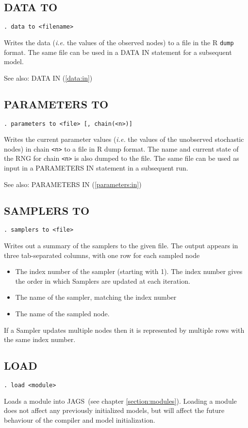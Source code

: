 \documentclass[11pt, a4paper, titlepage]{report}
\newcommand{\JAGS}{\textsf{JAGS}}
\begin{document}
\subsection{DATA TO}
\label{data:to}
\begin{verbatim}
. data to <filename>
\end{verbatim}
Writes the data ({\em i.e.} the values of the observed nodes) to a
file in the R \texttt{dump} format. The same file can be used in a
DATA IN statement for a subsequent model.

See also: DATA IN (\ref{data:in})

\subsection{PARAMETERS TO}
\label{parameters:to}
\begin{verbatim}
. parameters to <file> [, chain(<n>)]
\end{verbatim}
Writes the current parameter values ({\em i.e.} the values of the
unobserved stochastic nodes) in chain \texttt{<n>} to a file in R dump
format. The name and current state of the RNG for chain \texttt{<n>}
is also dumped to the file.  The same file can be used as input in a
PARAMETERS IN statement in a subsequent run.

See also: PARAMETERS IN (\ref{parameters:in})

\subsection{SAMPLERS TO}
\label{samplers:to}
\begin{verbatim}
. samplers to <file>
\end{verbatim}
Writes out a summary of the samplers to the given file.  The output appears
in three tab-separated columns, with one row for each sampled node
\begin{itemize}
\item The index number of the sampler (starting with 1). The index number 
gives the order in which Samplers are updated at each iteration.
\item The name of the sampler, matching the index number
\item The name of the sampled node. 
\end{itemize}
If a Sampler updates multiple nodes then it is represented by multiple rows
with the same index number.

\subsection{LOAD}
\label{load}
\begin{verbatim}
. load <module>
\end{verbatim}
Loads a module into \JAGS\ (see chapter \ref{section:modules}). Loading
a module does not affect any previously initialized models, but will
affect the future behaviour of the compiler and model initialization.
\end{document}

